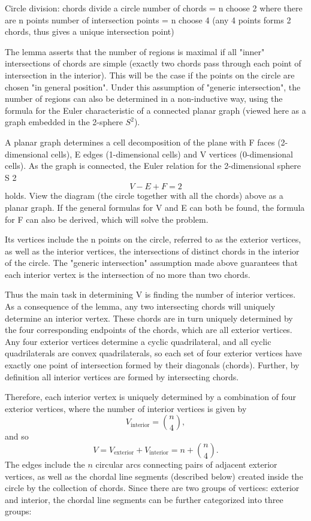 \begin{solution}
Circle division: chords divide a circle
number of chords = n choose 2 where there are n points
number of intersection points = n choose 4 (any 4 points forms 2 chords, thus gives a unique intersection point)

The lemma asserts that the number of regions is maximal if all "inner" intersections of chords are simple (exactly two chords pass through each point of intersection in the interior). This will be the case if the points on the circle are chosen "in general position". Under this assumption of "generic intersection", the number of regions can also be determined in a non-inductive way, using the formula for the Euler characteristic of a connected planar graph (viewed here as a graph embedded in the 2-sphere $S^2$).

A planar graph determines a cell decomposition of the plane with F faces (2-dimensional cells), E edges (1-dimensional cells) and V vertices (0-dimensional cells). As the graph is connected, the Euler relation for the 2-dimensional sphere S 2
\[ V-E+F=2 \]
holds. View the diagram (the circle together with all the chords) above as a planar graph. If the general formulas for V and E can both be found, the formula for F can also be derived, which will solve the problem.

Its vertices include the n points on the circle, referred to as the exterior vertices, as well as the interior vertices, the intersections of distinct chords in the interior of the circle. The "generic intersection" assumption made above guarantees that each interior vertex is the intersection of no more than two chords.

Thus the main task in determining V is finding the number of interior vertices. As a consequence of the lemma, any two intersecting chords will uniquely determine an interior vertex. These chords are in turn uniquely determined by the four corresponding endpoints of the chords, which are all exterior vertices. Any four exterior vertices determine a cyclic quadrilateral, and all cyclic quadrilaterals are convex quadrilaterals, so each set of four exterior vertices have exactly one point of intersection formed by their diagonals (chords). Further, by definition all interior vertices are formed by intersecting chords.

Therefore, each interior vertex is uniquely determined by a combination of four exterior vertices, where the number of interior vertices is given by
\[ V_\text{interior}=\binom{n}{4}, \]
and so
\[ V=V_\text{exterior}+V_\text{interior}=n+\binom{n}{4}. \]
The edges include the $n$ circular arcs connecting pairs of adjacent exterior vertices, as well as the chordal line segments (described below) created inside the circle by the collection of chords. Since there are two groups of vertices: exterior and interior, the chordal line segments can be further categorized into three groups:


\end{solution}
